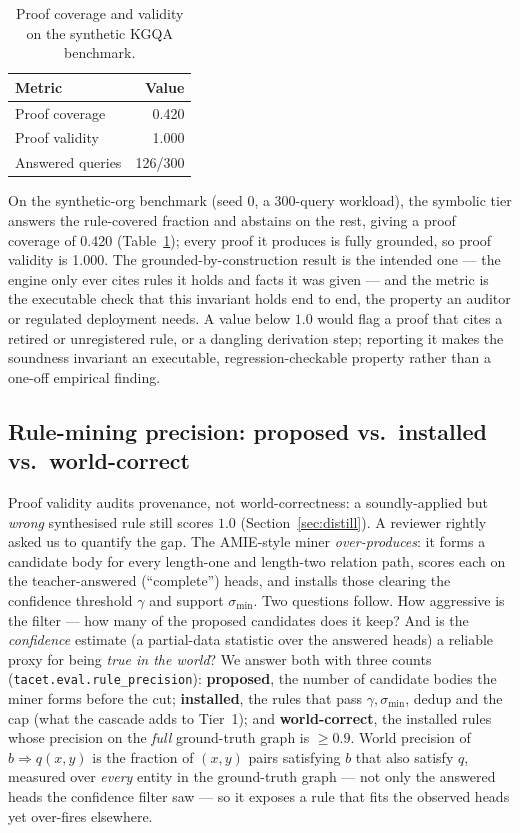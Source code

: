 \documentclass[11pt]{article}
\theoremstyle{plain}
\newcommand{\proofValidity}{1.000}
\newcommand{\proofCoverage}{0.420}
\renewcommand{\proofCoverage}{0.420}
\renewcommand{\proofValidity}{1.000}
\begin{document}
\begin{table}[t]
\centering
\caption{Proof coverage and validity on the synthetic KGQA benchmark.}
\label{tab:audit}
\begin{tabular}{lr}
\toprule
Metric & Value \\
\midrule
Proof coverage & 0.420 \\
Proof validity & 1.000 \\
Answered queries & 126/300 \\
\bottomrule
\end{tabular}

\end{table}

On the synthetic-org benchmark (seed $0$, a $300$-query workload), the symbolic
tier answers the rule-covered fraction and abstains on the rest, giving a proof
coverage of \proofCoverage{} (Table~\ref{tab:audit}); every proof it produces is
fully grounded, so proof validity is \proofValidity{}. The grounded-by-construction result is the
intended one --- the engine only ever cites rules it holds and facts it was
given --- and the metric is the executable check that this invariant holds end
to end, the property an auditor or regulated deployment needs. A value below
$1.0$ would flag a proof that cites a retired or unregistered rule, or a
dangling derivation step; reporting it makes the soundness invariant an
executable, regression-checkable property rather than a one-off empirical
finding.

\subsection{Rule-mining precision: proposed vs.\ installed vs.\ world-correct}
\label{sec:rule_precision}

Proof validity audits provenance, not world-correctness: a soundly-applied but
\emph{wrong} synthesised rule still scores $1.0$
(Section~\ref{sec:distill}). A reviewer rightly asked us to quantify the gap. The
AMIE-style miner \emph{over-produces}: it forms a candidate body for every
length-one and length-two relation path, scores each on the teacher-answered
(``complete'') heads, and installs those clearing the confidence threshold
$\gamma$ and support $\sigma_{\mathrm{min}}$. Two questions follow. How aggressive is the
filter --- how many of the proposed candidates does it keep? And is the
\emph{confidence} estimate (a partial-data statistic over the answered heads) a
reliable proxy for being \emph{true in the world}? We answer both with three
counts (\texttt{tacet.eval.rule\_precision}):
\textbf{proposed}, the number of candidate bodies the miner forms before the
cut; \textbf{installed}, the rules that pass $\gamma,\sigma_{\mathrm{min}}$, dedup and the cap
(what the cascade adds to Tier~1); and \textbf{world-correct}, the installed
rules whose precision on the \emph{full} ground-truth graph is $\ge 0.9$. World
precision of $b\Rightarrow q(x,y)$ is the fraction of $(x,y)$ pairs satisfying
$b$ that also satisfy $q$, measured over \emph{every} entity in the ground-truth
graph --- not only the answered heads the confidence filter saw --- so it
exposes a rule that fits the observed heads yet over-fires elsewhere.
\end{document}
